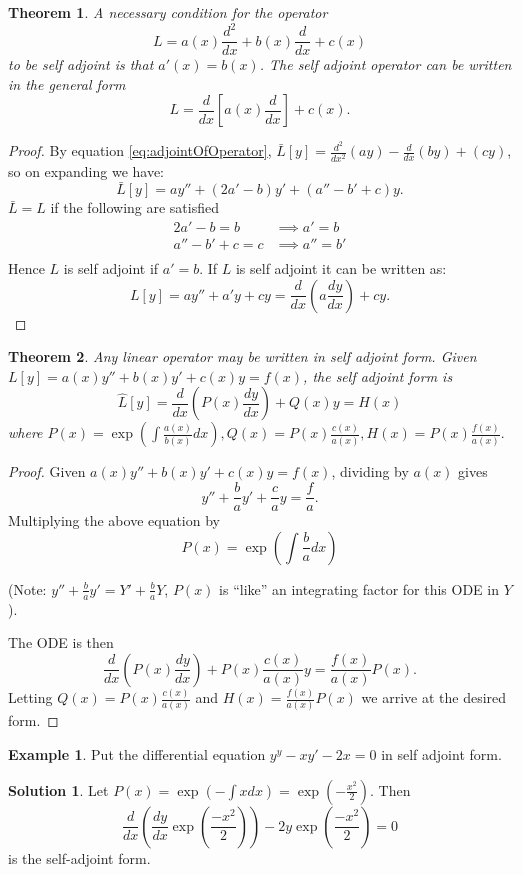 \documentclass{article}
\theoremstyle{plain}
\newtheorem{thm}{Theorem}[section]
\theoremstyle{definition}
\newtheorem{exmp}{Example}[section]
\newtheorem*{sol}{Solution}
\numberwithin{equation}{section}
\begin{document}
\begin{thm}
    A necessary condition for the operator
    \[ L = a(x) \frac{d^2}{dx} + b(x) \frac{d}{dx} + c(x) \]
    to be self adjoint is that $a'(x) = b(x)$. The self adjoint operator can be written in the general form
    \[ L = \frac{d}{dx} \left[ a(x) \frac{d}{dx} \right] + c(x) .\]
\end{thm}
\begin{proof}
    By equation \eqref{eq:adjointOfOperator}, $\bar{L}[y] = \frac{d^2}{dx^2} (ay) - \frac{d}{dx}(by) + (cy)$, so on expanding we have:
    \[ \bar{L}[y] = ay'' + (2a'-b)y' + (a''-b'+c)y.\]
    $\bar{L}=L$ if the following are satisfied
    \begin{align*}
        2a'-b = b &\implies a' = b \\
        a'' - b' + c = c &\implies a'' = b' \\
    \end{align*}
    Hence $L$ is self adjoint if $a'=b$. If $L$ is self adjoint it can be written as:
    \[ L[y] = ay'' + a'y + cy = \frac{d}{dx} \left( a\frac{dy}{dx} \right) + cy. \]
\end{proof}

\begin{thm}\label{thm:writeOperatorSelfAdjoin}
    Any linear operator may be written in self adjoint form. Given $L[y] = a(x)y'' + b(x)y' + c(x)y = f(x)$, the self adjoint form is 
    \[\hat{L}[y] = \frac{d}{dx}\left(P(x) \frac{dy}{dx} \right) + Q(x)y = H(x)\]
    where $P(x) = \exp\left(\int \frac{a(x)}{b(x)} dx \right), Q(x) = P(x)\frac{c(x)}{a(x)}, H(x)=P(x)\frac{f(x)}{a(x)}.$
\end{thm}

\begin{proof}
    Given $a(x)y'' + b(x)y' + c(x)y = f(x)$, dividing by $a(x)$ gives
    \[ y'' + \frac{b}{a} y' + \frac{c}{a}y = \frac{f}{a}. \]
    Multiplying the above equation by
    \[ P(x) = \exp\left(\int \frac{b}{a} dx \right) \]

    (Note: $y'' + \frac{b}{a}y' = Y' + \frac{b}{a}Y$, $P(x)$ is ``like'' an integrating factor for this ODE in $Y$).

    The ODE is then
    \[ \frac{d}{dx} \left(P(x)\frac{dy}{dx} \right) + P(x)\frac{c(x)}{a(x)}y  = \frac{f(x)}{a(x)}P(x).\]
    Letting $Q(x) = P(x)\frac{c(x)}{a(x)}$ and $H(x)=\frac{f(x)}{a(x)}P(x)$ we arrive at the desired form.
\end{proof}

\begin{tcolorbox}
    \begin{exmp}
        Put the differential equation $y^y - xy' -2x=0$ in self adjoint form.
    \end{exmp}
    \begin{sol}
        Let $P(x) = \exp\left(-\int x dx\right) = \exp(-\frac{x^2}{2}).$ Then
        \[ \frac{d}{dx}\left( \frac{dy}{dx} \exp\left(\frac{-x^2}{2}\right) \right) - 2y\exp\left(\frac{-x^2}{2}\right) = 0\]
        is the self-adjoint form.
    \end{sol}
\end{tcolorbox}
\end{document}
